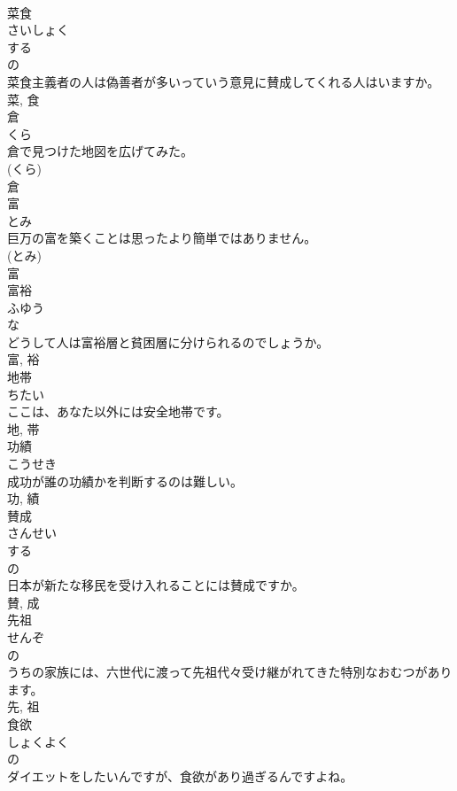 \documentclass[8pt]{extreport}
\begin{document}
\begin{CJK}{UTF8}{min}
\\	菜食	
\\	さいしょく	
\\	する 
\\	の 
\\	菜食主義者の人は偽善者が多いっていう意見に賛成してくれる人はいますか。	
\\	菜, 食	
\\	倉	
\\	くら	
\\	倉で見つけた地図を広げてみた。	
\\	(くら) 
\\	倉	
\\	富	
\\	とみ	
\\	巨万の富を築くことは思ったより簡単ではありません。	
\\	(とみ) 
\\	富	
\\	富裕	
\\	ふゆう	
\\	な 
\\	どうして人は富裕層と貧困層に分けられるのでしょうか。	
\\	富, 裕	
\\	地帯	
\\	ちたい	
\\	ここは、あなた以外には安全地帯です。	
\\	地, 帯	
\\	功績	
\\	こうせき	
\\	成功が誰の功績かを判断するのは難しい。	
\\	功, 績	
\\	賛成	
\\	さんせい	
\\	する 
\\	の 
\\	日本が新たな移民を受け入れることには賛成ですか。	
\\	賛, 成	
\\	先祖	
\\	せんぞ	
\\	の 
\\	うちの家族には、六世代に渡って先祖代々受け継がれてきた特別なおむつがあります。	
\\	先, 祖	
\\	食欲	
\\	しょくよく	
\\	の 
\\	ダイエットをしたいんですが、食欲があり過ぎるんですよね。	

\end{CJK}
\end{document}
